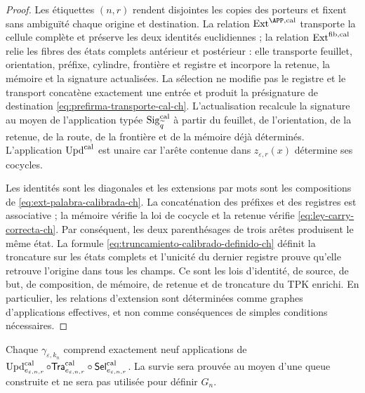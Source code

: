 \begin{proof}
Les étiquettes \((n,r)\) rendent disjointes les copies des porteurs et fixent
sans ambiguïté chaque origine et destination. La relation
\(\operatorname{Ext}^{\APP,\rm cal}\) transporte la cellule complète et
préserve les deux identités euclidiennes ; la relation
\(\operatorname{Ext}^{\rm fib,cal}\) relie les fibres des états
complets antérieur et postérieur : elle transporte feuillet, orientation, préfixe,
cylindre, frontière et registre et incorpore la retenue, la mémoire et la signature
actualisées. La sélection ne modifie pas le registre et le transport concatène
exactement une entrée et produit la présignature de destination
\eqref{eq:prefirma-transporte-cal-ch}. L’actualisation recalcule la signature au moyen de
l’application typée \(\operatorname{Sig}^{\rm cal}_{\widetilde q}\) à partir du
feuillet, de l’orientation, de la retenue, de la route, de la frontière et de la mémoire déjà déterminés. L’application
\(\operatorname{Upd}^{\rm cal}\) est unaire car l’arête contenue dans
\(z_{\varepsilon,r}(x)\) détermine ses cocycles.

Les identités sont les diagonales et les extensions par mots sont les
compositions de \eqref{eq:ext-palabra-calibrada-ch}. La concaténation des
préfixes et des registres est associative ; la mémoire vérifie la loi de cocycle et
la retenue vérifie
\eqref{eq:ley-carry-correcta-ch}. Par conséquent, les deux parenthésages de trois
arêtes produisent le même état. La formule
\eqref{eq:truncamiento-calibrado-definido-ch} définit la troncature sur
les états complets et l’unicité du dernier registre prouve qu’elle retrouve
l’origine dans tous les champs. Ce sont les lois d’identité, de source,
de but, de composition, de mémoire, de retenue et de troncature du TPK enrichi.
En particulier, les relations d’extension sont déterminées comme graphes
d’applications effectives, et non comme conséquences de simples conditions
nécessaires.
\end{proof}

Chaque \(\gamma_{\varepsilon,k_n}\) comprend exactement neuf applications de \(\operatorname{Upd}^{\rm cal}_{e_{\varepsilon,n,r}}\circ
\mathsf{Tra}^{\rm cal}_{e_{\varepsilon,n,r}}\circ
\mathsf{Sel}^{\rm cal}_{e_{\varepsilon,n,r}}\). La survie sera prouvée au moyen d'une queue construite et ne sera pas utilisée pour définir \(G_n\).

